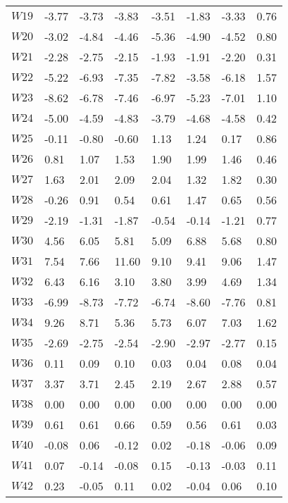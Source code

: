 \documentclass{article}
\begin{document}
\begin{longtable}{llllllll}
    $W19$ &   -3.77 & -3.73 & -3.83 & -3.51 & -1.83 & -3.33 & 0.76 \\
    $W20$ &   -3.02 & -4.84 & -4.46 & -5.36 & -4.90 & -4.52 & 0.80 \\
    $W21$ &   -2.28 & -2.75 & -2.15 & -1.93 & -1.91 & -2.20 & 0.31 \\
    $W22$ &   -5.22 & -6.93 & -7.35 & -7.82 & -3.58 & -6.18 & 1.57 \\
    $W23$ &   -8.62 & -6.78 & -7.46 & -6.97 & -5.23 & -7.01 & 1.10 \\
    $W24$ &   -5.00 & -4.59 & -4.83 & -3.79 & -4.68 & -4.58 & 0.42 \\
    $W25$ &   -0.11 & -0.80 & -0.60 & 1.13  & 1.24  & 0.17  & 0.86 \\
    $W26$ &   0.81  & 1.07  & 1.53  & 1.90  & 1.99  & 1.46  & 0.46 \\
    $W27$ &   1.63  & 2.01  & 2.09  & 2.04  & 1.32  & 1.82  & 0.30 \\
    $W28$ &   -0.26 & 0.91  & 0.54  & 0.61  & 1.47  & 0.65  & 0.56 \\
    $W29$ &   -2.19 & -1.31 & -1.87 & -0.54 & -0.14 & -1.21 & 0.77 \\
    $W30$ &   4.56  & 6.05  & 5.81  & 5.09  & 6.88  & 5.68  & 0.80 \\
    $W31$ &   7.54  & 7.66  & 11.60 & 9.10  & 9.41  & 9.06  & 1.47 \\
    $W32$ &   6.43  & 6.16  & 3.10  & 3.80  & 3.99  & 4.69  & 1.34 \\
    $W33$ &   -6.99 & -8.73 & -7.72 & -6.74 & -8.60 & -7.76 & 0.81 \\
    $W34$ &   9.26  & 8.71  & 5.36  & 5.73  & 6.07  & 7.03  & 1.62 \\
    $W35$ &   -2.69 & -2.75 & -2.54 & -2.90 & -2.97 & -2.77 & 0.15 \\
    $W36$ &   0.11  & 0.09  & 0.10  & 0.03  & 0.04  & 0.08  & 0.04 \\
    $W37$ &   3.37  & 3.71  & 2.45  & 2.19  & 2.67  & 2.88  & 0.57 \\
    $W38$ &   0.00  & 0.00  & 0.00  & 0.00  & 0.00  & 0.00  & 0.00 \\
    $W39$ &   0.61  & 0.61  & 0.66  & 0.59  & 0.56  & 0.61  & 0.03 \\
    $W40$ &   -0.08 & 0.06  & -0.12 & 0.02  & -0.18 & -0.06 & 0.09 \\
    $W41$ &   0.07  & -0.14 & -0.08 & 0.15  & -0.13 & -0.03 & 0.11 \\
    $W42$ &   0.23  & -0.05 & 0.11  & 0.02  & -0.04 & 0.06  & 0.10 \\

\end{longtable}
\end{document}
